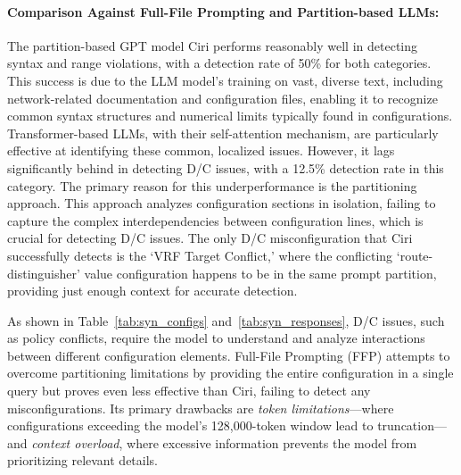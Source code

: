 \paragraph{Comparison Against Full-File Prompting and Partition-based LLMs:} The partition-based GPT model Ciri performs reasonably well in detecting syntax and range violations, with a detection rate of 50\% for both categories.
This success is due to the LLM model's training on vast, diverse text, including network-related documentation and configuration files, enabling it to recognize common syntax structures and numerical limits typically found in configurations. Transformer-based LLMs, with their self-attention mechanism, are particularly effective at identifying these common, localized issues.
However, it lags significantly behind \sysname{} in detecting D/C issues, with a 12.5\% detection rate in this category. The primary reason for this underperformance is the partitioning approach. This approach analyzes configuration sections in isolation, failing to capture the complex interdependencies between configuration lines, which is crucial for detecting D/C issues. The only D/C misconfiguration that Ciri successfully detects is the `VRF Target Conflict,' where the conflicting `route-distinguisher' value configuration happens to be in the same prompt partition, providing just enough context for accurate detection.

As shown in Table~\ref{tab:syn_configs} and~\ref{tab:syn_responses}, D/C issues, such as policy conflicts, require the model to understand and analyze interactions between different configuration elements.
Full-File Prompting (FFP) attempts to overcome partitioning limitations by providing the entire configuration in a single query but proves even less effective than Ciri, failing to detect any misconfigurations. Its primary drawbacks are \textit{token limitations}—where configurations exceeding the model’s 128,000-token window lead to truncation—and \textit{context overload}, where excessive information prevents the model from prioritizing relevant details. 

